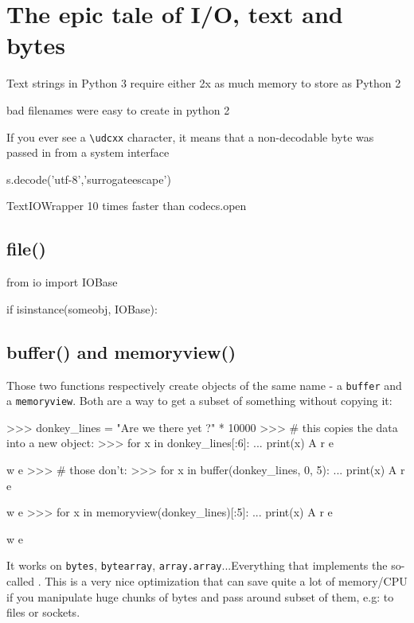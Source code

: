 \chapter{The epic tale of I/O, text and bytes}


Text strings in Python 3 require either 2x as much memory to store as Python 2


bad filenames were easy to create in python 2

If you ever see a \lstinline{\udcxx} character, it means that a non-decodable byte was passed in from a system interface

s.decode('utf-8','surrogateescape')

TextIOWrapper 10 times faster than codecs.open


\section{file()}

\begin{py2}
from io import IOBase

if isinstance(someobj, IOBase):
\end{py2}

\section{buffer() and memoryview()}

Those two functions respectively create objects of the same name - a \lstinline{buffer} and a \lstinline{memoryview}. Both are a way to get a subset of something without copying it:

\begin{py2}
>>> donkey_lines = "Are we there yet ?\n" * 10000
>>> # this copies the data into a new object:
>>> for x in donkey_lines[:6]:
...    print(x)
A
r
e

w
e
>>> # those don't:
>>> for x in buffer(donkey_lines, 0, 5):
...    print(x)
A
r
e

w
e
>>> for x in memoryview(donkey_lines)[:5]:
...    print(x)
A
r
e

w
e
\end{py2}

It works on \lstinline{bytes}, \lstinline{bytearray}, \lstinline{array.array}...Everything that implements the so-called . This is a very nice optimization that can save quite a lot of memory/CPU if you manipulate huge chunks of bytes and pass around subset of them, e.g: to files or sockets.

